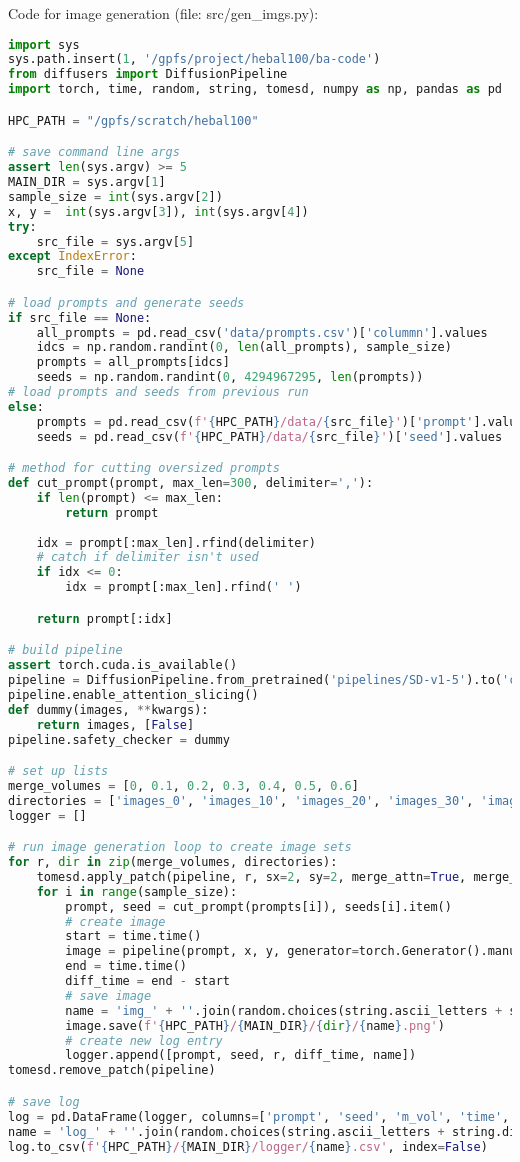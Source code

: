 Code for image generation (file: src/gen\_imgs.py):
\begin{lstlisting}[language=Python]
import sys       
sys.path.insert(1, '/gpfs/project/hebal100/ba-code')
from diffusers import DiffusionPipeline
import torch, time, random, string, tomesd, numpy as np, pandas as pd

HPC_PATH = "/gpfs/scratch/hebal100"

# save command line args
assert len(sys.argv) >= 5
MAIN_DIR = sys.argv[1]                      
sample_size = int(sys.argv[2])            
x, y =  int(sys.argv[3]), int(sys.argv[4]) 
try:
    src_file = sys.argv[5]                
except IndexError:
    src_file = None          

# load prompts and generate seeds
if src_file == None:
    all_prompts = pd.read_csv('data/prompts.csv')['colummn'].values
    idcs = np.random.randint(0, len(all_prompts), sample_size)
    prompts = all_prompts[idcs]
    seeds = np.random.randint(0, 4294967295, len(prompts))
# load prompts and seeds from previous run
else:
    prompts = pd.read_csv(f'{HPC_PATH}/data/{src_file}')['prompt'].values
    seeds = pd.read_csv(f'{HPC_PATH}/data/{src_file}')['seed'].values

# method for cutting oversized prompts
def cut_prompt(prompt, max_len=300, delimiter=','):
    if len(prompt) <= max_len:
        return prompt
    
    idx = prompt[:max_len].rfind(delimiter)
    # catch if delimiter isn't used
    if idx <= 0:
        idx = prompt[:max_len].rfind(' ')

    return prompt[:idx]

# build pipeline
assert torch.cuda.is_available()
pipeline = DiffusionPipeline.from_pretrained('pipelines/SD-v1-5').to('cuda')
pipeline.enable_attention_slicing()
def dummy(images, **kwargs):
    return images, [False]
pipeline.safety_checker = dummy

# set up lists
merge_volumes = [0, 0.1, 0.2, 0.3, 0.4, 0.5, 0.6]
directories = ['images_0', 'images_10', 'images_20', 'images_30', 'images_40', 'images_50', 'images_60']
logger = []

# run image generation loop to create image sets
for r, dir in zip(merge_volumes, directories):
    tomesd.apply_patch(pipeline, r, sx=2, sy=2, merge_attn=True, merge_crossattn=False, merge_mlp=False)
    for i in range(sample_size):
        prompt, seed = cut_prompt(prompts[i]), seeds[i].item()
        # create image
        start = time.time()
        image = pipeline(prompt, x, y, generator=torch.Generator().manual_seed(seed), ).images[0]
        end = time.time()
        diff_time = end - start
        # save image
        name = 'img_' + ''.join(random.choices(string.ascii_letters + string.digits, k=10))
        image.save(f'{HPC_PATH}/{MAIN_DIR}/{dir}/{name}.png')
        # create new log entry
        logger.append([prompt, seed, r, diff_time, name])       
tomesd.remove_patch(pipeline)

# save log
log = pd.DataFrame(logger, columns=['prompt', 'seed', 'm_vol', 'time', 'name'])
name = 'log_' + ''.join(random.choices(string.ascii_letters + string.digits, k=5))
log.to_csv(f'{HPC_PATH}/{MAIN_DIR}/logger/{name}.csv', index=False)
\end{lstlisting}
